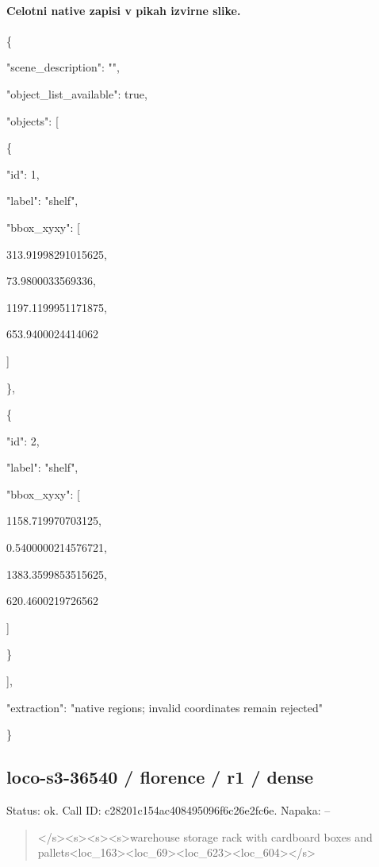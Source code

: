 \documentclass[10pt,a4paper]{article}
\begin{document}
\paragraph{Celotni native zapisi v pikah izvirne slike.}
\{\par
  "scene\_description":\allowbreak{} "",\allowbreak{}\par
  "object\_list\_available":\allowbreak{} true,\allowbreak{}\par
  "objects":\allowbreak{} [\par
    \{\par
      "id":\allowbreak{} 1,\allowbreak{}\par
      "label":\allowbreak{} "shelf",\allowbreak{}\par
      "bbox\_xyxy":\allowbreak{} [\par
        313.91998291015625,\allowbreak{}\par
        73.9800033569336,\allowbreak{}\par
        1197.1199951171875,\allowbreak{}\par
        653.9400024414062\par
      ]\par
    \},\allowbreak{}\par
    \{\par
      "id":\allowbreak{} 2,\allowbreak{}\par
      "label":\allowbreak{} "shelf",\allowbreak{}\par
      "bbox\_xyxy":\allowbreak{} [\par
        1158.719970703125,\allowbreak{}\par
        0.5400000214576721,\allowbreak{}\par
        1383.3599853515625,\allowbreak{}\par
        620.4600219726562\par
      ]\par
    \}\par
  ],\allowbreak{}\par
  "extraction":\allowbreak{} "native regions; invalid coordinates remain rejected"\par
\}
\subsection*{loco-s3-36540 / florence / r1 / dense}
Status: ok. Call ID: c28201c154ac408495096f6c26e2fc6e. Napaka: --
\begin{quote}\footnotesize
</s>\allowbreak{}<s>\allowbreak{}<s>\allowbreak{}<s>\allowbreak{}warehouse storage rack with cardboard boxes and pallets<loc\_163>\allowbreak{}<loc\_69>\allowbreak{}<loc\_623\allowbreak{}>\allowbreak{}<loc\_604>\allowbreak{}</s>\allowbreak{}
\end{quote}
\end{document}
